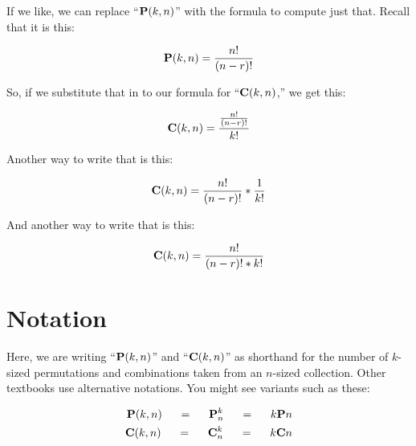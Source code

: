 \documentclass[../../../main.tex]{subfiles}
\begin{document}
\noindent
If we like, we can replace ``$\mathbf{P}(k, n)$'' with the formula to compute just that. Recall that it is this:

\begin{equation*}
  \mathbf{P}(k, n) = \frac{n!}{(n - r)!}
\end{equation*}

\noindent
So, if we substitute that in to our formula for ``$\mathbf{C}(k, n)$,'' we get this:

\begin{equation*}
  \mathbf{C}(k, n) = \frac{\frac{n!}{(n - r)!}}{k!}
\end{equation*}

\noindent
Another way to write that is this:

\begin{equation*}
  \mathbf{C}(k, n) = \frac{n!}{(n - r)!} * \frac{1}{k!}
\end{equation*}

\noindent
And another way to write that is this:

\begin{equation*}
  \mathbf{C}(k, n) = \frac{n!}{(n - r)! * k!}
\end{equation*}


\section{Notation}

Here, we are writing ``$\mathbf{P}(k, n)$'' and ``$\mathbf{C}(k, n)$'' as shorthand for the number of $k$-sized permutations and combinations taken from an $n$-sized collection. Other textbooks use alternative notations. You might see variants such as these:

\begin{align*}
    \mathbf{P}(k, n) \hskip 0.5cm = \hskip 0.5cm \mathbf{P}^{k}_{n} \hskip 0.5cm = \hskip 0.5cm k\mathbf{P}n \\
    \mathbf{C}(k, n) \hskip 0.5cm = \hskip 0.5cm \mathbf{C}^{k}_{n} \hskip 0.5cm = \hskip 0.5cm k\mathbf{C}n
\end{align*}
\end{document}
